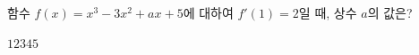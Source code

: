 함수 $f(x)=x^3-3x^2+ax+5$에 대하여 $f'(1)=2$일 때, 상수 $a$의 값은?
\begin{choices32}{$1$}{$2$}{$3$}{$4$}{$5$}\end{choices32}
